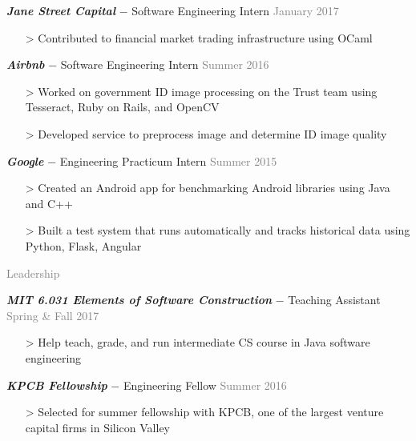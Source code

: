 \documentclass[11pt]{article}
\newcommand{\rsection}[1]{\vspace{1.5em}\textcolor{gray}{\Large \robotoslab #1}\vspace{0.5em}}
\newcommand{\bt}[1]{\textit{\textbf{#1}}} %
\newcommand{\gap}[0]{\vspace{0.3em}} %
\newcommand{\dash}[0]{ $-$ } %
\newcommand{\gray}[1]{\textcolor{gray}{#1}}
\newcommand{\e}[0]{> }
\begin{document}
\gap

\bt{Jane Street Capital}\dash Software Engineering Intern \hfill \gray{January 2017}

\begin{itemize}
\item[\e] Contributed to financial market trading infrastructure using OCaml
\end{itemize}

\gap

\bt{Airbnb}\dash Software Engineering Intern \hfill \gray{Summer 2016}

\begin{itemize}
\item[\e] Worked on government ID image processing on the Trust team using Tesseract, Ruby on Rails, and OpenCV
\item[\e] Developed service to preprocess image and determine ID image quality
\end{itemize}

\gap

\bt{Google}\dash Engineering Practicum Intern \hfill \gray{Summer 2015}

\begin{itemize}
\item[\e] Created an Android app for benchmarking Android libraries using Java and C++
\item[\e] Built a test system that runs automatically and tracks historical data using Python, Flask, Angular
\end{itemize}

\rsection{Leadership}

\bt{MIT 6.031 Elements of Software Construction}\dash Teaching Assistant \hfill \gray{Spring \& Fall 2017}

\begin{itemize}
\item[\e] Help teach, grade, and run intermediate CS course in Java software engineering
\end{itemize}

\gap

\bt{KPCB Fellowship}\dash Engineering Fellow \hfill \gray{Summer 2016}

\begin{itemize}
\item[\e] Selected for summer fellowship with KPCB, one of the largest venture capital firms in Silicon Valley
\end{itemize}

\gap
\end{document}
